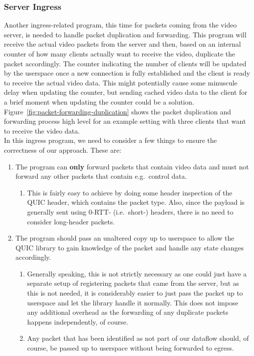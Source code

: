 \subsubsection{Server Ingress}
Another ingress-related program, this time for packets coming from the video server, is needed
to handle packet duplication and forwarding.
This program will receive the actual video packets from the server and then, based on an internal 
counter of how many clients actually want to receive the video, duplicate the packet accordingly.
The counter indicating the number of clients will be updated by the userspace once a new connection 
is fully established and the client is ready to receive the actual video data.
This might potentially cause some minuscule delay when updating the counter, but sending cached 
video data to the client for a brief moment when updating the counter could be a solution. %
Figure~\ref{fig:packet-forwarding-duplication} shows the packet duplication and forwarding process 
high level for an example setting with three clients that want to receive the video data.
\\
In this ingress program, we need to consider a few things to ensure the correctness
of our approach.
These are:
\begin{enumerate}
    \item   The program can \textbf{only} forward packets that contain video data and must not 
            forward any other packets that contain e.g.~control data.
    \begin{enumerate}
        \item   This is fairly easy to achieve by doing some header inspection of the QUIC header,
                which contains the packet type. Also, since the payload is generally sent using 
                0-RTT- (i.e.~short-) headers, there is no need to consider long-header packets.
    \end{enumerate}

    \item   The program should pass an unaltered copy up to userspace to allow the QUIC library to
            gain knowledge of the packet and handle any state changes accordingly.
    \begin{enumerate}
        \item   Generally speaking, this is not strictly necessary as one could just have a separate 
                setup of registering packets that came from the server, but as this is not needed,
                it is considerably easier to just pass the packet up to userspace and let the 
                library handle it normally. This does not impose any additional overhead as the
                forwarding of any duplicate packets happens independently, of course.
        \item   Any packet that has been identified as not part of our dataflow should, of course, 
                be passed up to userspace without being forwarded to egress.
    \end{enumerate}
\end{enumerate}


